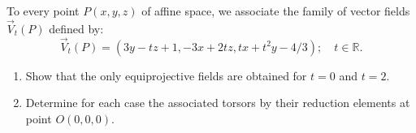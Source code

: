 \documentclass[12pt]{article}
\begin{document}
\section{}

To every point $P(x, y, z)$ of affine space, we associate the family of vector fields $\vec{V}_t(P)$ defined by: 
$$\vec{V}_t(P) = (3y - tz + 1, -3x + 2tz, tx + t^2y - 4/3); \quad t \in \mathbb{R}.$$

\begin{enumerate}
    \item Show that the only equiprojective fields are obtained for $t = 0$ and $t = 2$.
    \item Determine for each case the associated torsors by their reduction elements at point $O(0, 0, 0)$.
\end{enumerate}
\end{document}
